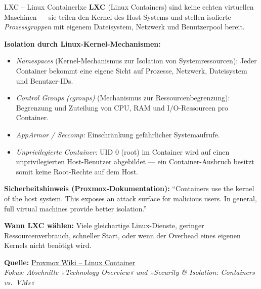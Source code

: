 \documentclass[a4paper,10pt,addpoints]{exam}
\begin{document}
\begin{infoBox}{LXC -- Linux Container}{lxc}
  \textbf{LXC} (Linux Containers) sind keine echten virtuellen Maschinen ---
  sie teilen den Kernel des Host-Systems und stellen isolierte
  \emph{Prozessgruppen} mit eigenem Dateisystem, Netzwerk und Benutzerpool bereit.

  \medskip
  \textbf{Isolation durch Linux-Kernel-Mechanismen:}
  \begin{itemize}
    \item \emph{Namespaces} (Kernel-Mechanismus zur Isolation von Systemressourcen):
      Jeder Container bekommt eine eigene Sicht auf Prozesse,
      Netzwerk, Dateisystem und Benutzer-IDs.
    \item \emph{Control Groups (cgroups)} (Mechanismus zur Ressourcenbegrenzung):
      Begrenzung und Zuteilung von CPU, RAM und I/O-Ressourcen pro Container.
    \item \emph{AppArmor / Seccomp:} Einschränkung gefährlicher Systemaufrufe.
    \item \emph{Unprivilegierte Container:} UID 0 (root) im Container wird auf einen
      unprivilegierten Host-Benutzer abgebildet --- ein Container-Ausbruch besitzt
      somit keine Root-Rechte auf dem Host.
  \end{itemize}

  \medskip
  \textbf{Sicherheitshinweis (Proxmox-Dokumentation):}
  \enquote{Containers use the kernel of the host system.
  This exposes an attack surface for malicious users. In general, full virtual
  machines provide better isolation.}

  \medskip
  \textbf{Wann LXC wählen:} Viele gleichartige Linux-Dienste, geringer
  Ressourcenverbrauch, schneller Start, oder wenn der Overhead eines eigenen
  Kernels nicht benötigt wird.

  \medskip\small
  \textbf{Quelle:} \href{https://pve.proxmox.com/wiki/Linux_Container}{Proxmox Wiki -- Linux Container}\\
  \hspace*{0.4em}\textit{Fokus: Abschnitte »Technology Overview« und
    »Security \& Isolation: Containers vs.\ VMs«}
\end{infoBox}
\end{document}
